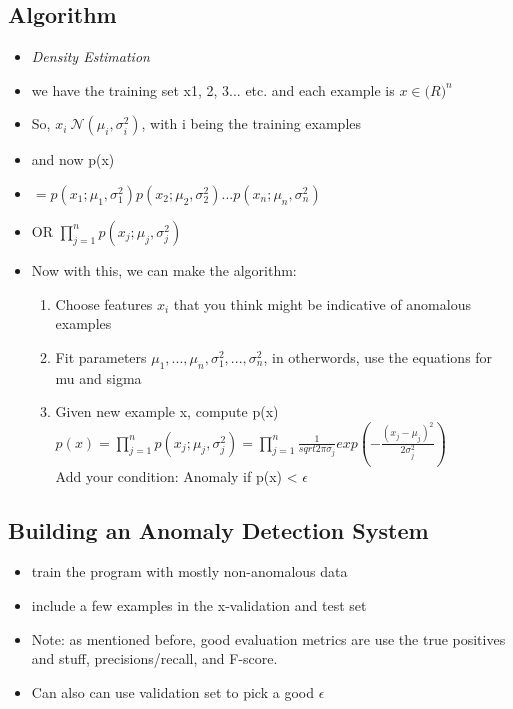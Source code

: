 \documentclass[]{article}
\begin{document}
	\subsection{Algorithm}
		\begin{itemize}
			\item \emph{Density Estimation}
			\item we have the training set x1, 2, 3... etc. and each example is $x \in \mathbb(R)^{n}$
			\item So, $x_{i} ~ \mathcal{N}(\mu_i,\sigma_i^2)$, with i being the training examples
			\item and now p(x)
			\item $= p(x_1;\mu_1,\sigma_1^2)p(x_2;\mu_2,\sigma_2^2)...p(x_n;\mu_n,\sigma_n^2)$
			\item OR $\prod\limits_{j=1}^{n}p(x_j;\mu_j,\sigma_j^2)$
			\item Now with this, we can make the algorithm:
			\begin{enumerate}
				\item Choose features $x_i$ that you think might be indicative of anomalous examples
				\item Fit parameters $\mu_1,...,\mu_n,\sigma_1^2,...,\sigma_n^2$, in otherwords, use the equations for mu and sigma
				\item Given new example x, compute p(x)
				\\	$p(x) = \prod\limits_{j=1}^{n}p(x_j;\mu_j,\sigma_j^2) = \prod\limits_{j=1}^{n}\frac{1}{sqrt{2\pi}\sigma_j}exp(-\frac{(x_j-\mu_j)^2}{2\sigma_j^2})$
				\\ Add your condition: Anomaly if p(x) < $\epsilon$
			\end{enumerate}
		\end{itemize}
		
	\subsection{Building an Anomaly Detection System}
		\begin{itemize}
			\item train the program with mostly non-anomalous data
			\item include a few examples in the x-validation and test set
			\item Note: as mentioned before, good evaluation metrics are use the true positives and stuff, precisions/recall, and F-score.
			\item Can also can use validation set to pick a good $\epsilon$
		\end{itemize}
		
\end{document}
